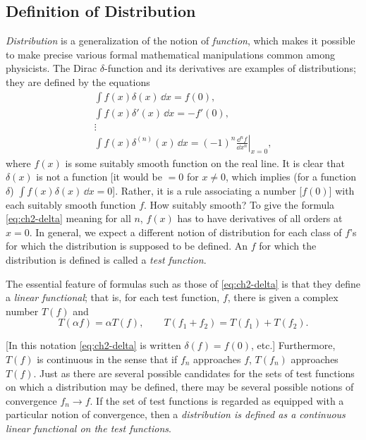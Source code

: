 \subsection{Definition of Distribution}\label{sec:2-1}

\emph{Distribution} is a generalization of the notion of \emph{function},
which makes it possible to make precise various formal mathematical
manipulations common among physicists. The Dirac $\delta$-function and its
derivatives are examples of distributions; they are defined by the equations
\begin{equation}
\begin{gathered}
  \int f(x)\delta(x)\,\dd x=f(0),\\
  \int f(x)\delta'(x)\,\dd x=-f'(0),\\[-2pt]
  \vdots\\[-2pt]
  \int f(x)\delta^{(n)}(x)\,\dd x
    =(-1)^n\left.\frac{\dd^n f}{\dd x^n}\right|_{x=0},
\end{gathered}
\tag{2-1}\label{eq:ch2-delta}
\end{equation}
where $f(x)$ is some suitably smooth function on the real line. It is clear
that $\delta(x)$ is not a function [it would be $=0$ for $x\ne0$, which implies
(for a function $\delta$) $\int f(x)\delta(x)\,\dd x=0$]. Rather, it is a rule
associating a number [$f(0)$] with each suitably smooth function $f$. How
suitably smooth? To give the formula \eqref{eq:ch2-delta} meaning for all $n$, $f(x)$ has to
have derivatives of all orders at $x=0$. In general, we expect a different
notion of distribution for each class of $f$'s for which the distribution is
supposed to be defined. An $f$ for which the distribution is defined is called
a \emph{test function}.

The essential feature of formulas such as those of \eqref{eq:ch2-delta} is that they define a
\emph{linear functional}; that is, for each test function, $f$, there is given
a complex number $T(f)$ and
\begin{equation}
  T(\alpha f)=\alpha T(f),\qquad
  T(f_1+f_2)=T(f_1)+T(f_2).
\tag{2-2}\label{eq:ch2-linear}
\end{equation}

[In this notation \eqref{eq:ch2-delta} is written $\delta(f)=f(0)$, etc.] Furthermore,
$T(f)$ is continuous in the sense that if $f_n$ approaches $f$, $T(f_n)$
approaches $T(f)$. Just as there are several possible candidates for the sets
of test functions on which a distribution may be defined, there may be several
possible notions of convergence $f_n\to f$. If the set of test functions is
regarded as equipped with a particular notion of convergence, then a
\emph{distribution is defined as a continuous linear functional on the test
functions}.

